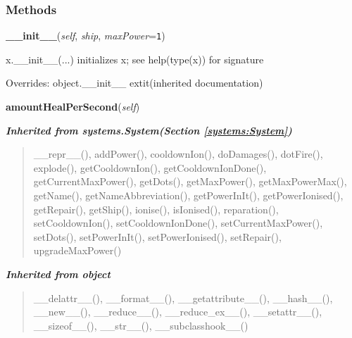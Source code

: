   \subsubsection{Methods}

    \vspace{0.5ex}

\hspace{.8\funcindent}\begin{boxedminipage}{\funcwidth}

    \raggedright \textbf{\_\_init\_\_}(\textit{self}, \textit{ship}, \textit{maxPower}={\tt 1})

\setlength{\parskip}{2ex}
    x.\_\_init\_\_(...) initializes x; see help(type(x)) for signature

\setlength{\parskip}{1ex}
      Overrides: object.\_\_init\_\_ 	extit{(inherited documentation)}

    \end{boxedminipage}

    \label{systems:Medbay:amountHealPerSecond}

    \vspace{0.5ex}

\hspace{.8\funcindent}\begin{boxedminipage}{\funcwidth}

    \raggedright \textbf{amountHealPerSecond}(\textit{self})

\setlength{\parskip}{2ex}
\setlength{\parskip}{1ex}
    \end{boxedminipage}


\large{\textbf{\textit{Inherited from systems.System\textit{(Section \ref{systems:System})}}}}

\begin{quote}
\_\_repr\_\_(), addPower(), cooldownIon(), doDamages(), dotFire(), explode(), getCooldownIon(), getCooldownIonDone(), getCurrentMaxPower(), getDots(), getMaxPower(), getMaxPowerMax(), getName(), getNameAbbreviation(), getPowerInIt(), getPowerIonised(), getRepair(), getShip(), ionise(), isIonised(), reparation(), setCooldownIon(), setCooldownIonDone(), setCurrentMaxPower(), setDots(), setPowerInIt(), setPowerIonised(), setRepair(), upgradeMaxPower()
\end{quote}

\large{\textbf{\textit{Inherited from object}}}

\begin{quote}
\_\_delattr\_\_(), \_\_format\_\_(), \_\_getattribute\_\_(), \_\_hash\_\_(), \_\_new\_\_(), \_\_reduce\_\_(), \_\_reduce\_ex\_\_(), \_\_setattr\_\_(), \_\_sizeof\_\_(), \_\_str\_\_(), \_\_subclasshook\_\_()
\end{quote}

